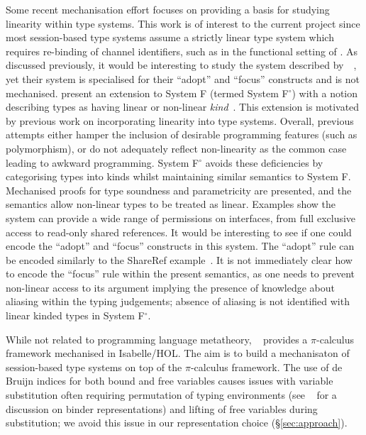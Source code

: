 \documentclass{mprop}
\newcommand{\fpop}{System F${}^\circ$\xspace}
\newcommand{\1}{\textbf{1}\xspace}
\begin{document}
Some recent mechanisation effort focuses on providing a basis for studying linearity within type systems. This work is of interest to the current project since most session-based type systems assume a strictly linear type system which requires re-binding of channel identifiers, such as in the functional setting of \citeauthor{Gay:2010:LAST}. As discussed previously, it would be interesting to study the system described by~\citeauthor{Fahndrich:2002}~\cite{Fahndrich:2002}, yet their system is specialised for their ``adopt'' and ``focus'' constructs and is not mechanised. \citeauthor{Mazurak:2010:LLT} present an extension to System F (termed \fpop) with a notion describing types as having linear or non-linear \textit{kind}~\cite{Mazurak:2010:LLT}. This extension is motivated by previous work on incorporating linearity into type systems. Overall, previous attempts either hamper the inclusion of desirable programming features (such as polymorphism), or do not adequately reflect non-linearity as the common case leading to awkward programming. \fpop avoids these deficiencies by categorising types into kinds whilst maintaining similar semantics to System F. Mechanised proofs for type soundness and parametricity are presented, and the semantics allow non-linear types to be treated as linear. Examples show the system can provide a wide range of permissions on interfaces, from full exclusive access to read-only shared references. It would be interesting to see if one could encode the ``adopt'' and ``focus'' constructs in this system. The ``adopt'' rule can be encoded similarly to the ShareRef example~\cite{Mazurak:2010:LLT}. It is not immediately clear how to encode the ``focus'' rule within the present semantics, as one needs to prevent non-linear access to its argument implying the presence of knowledge about aliasing within the typing judgements; absence of aliasing is not identified with linear kinded types in \fpop.

While not related to programming language metatheory, \citeauthor{Gay:2001:FFP}~\cite{Gay:2001:FFP} provides a $\pi$-calculus framework mechanised in Isabelle/HOL. The aim is to build a mechanisaton of session-based type systems on top of the $\pi$-calculus framework. The use of de Bruijn indices for both bound and free variables causes issues with variable substitution often requiring permutation of typing environments (see \citeauthor{Aydemir:2008:EFM}~\cite{Aydemir:2008:EFM} for a discussion on binder representations) and lifting of free variables during substitution; we avoid this issue in our representation choice (\S \ref{sec:approach}).
\end{document}
